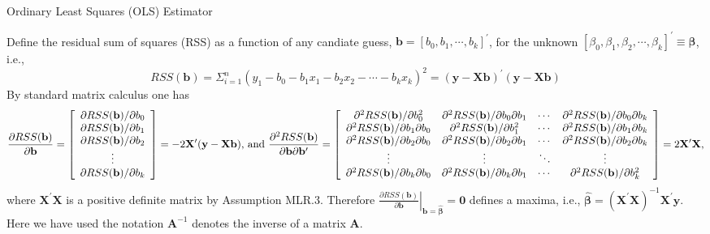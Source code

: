 \documentclass{article}%
\begin{document}
\bigskip

Ordinary Least Squares (OLS) Estimator

\bigskip

Define the residual sum of squares (RSS) as a function of any candiate guess,
$\mathbf{b}=[b_{0},b_{1},\cdots,b_{k}]^{\prime}$, for the unknown $[\beta
_{0},\beta_{1},\beta_{2},\cdots,\beta_{k}]^{\prime}\equiv\mathbf{\beta}$,
i.e.,%
\[
RSS(\mathbf{b})=\Sigma_{i=1}^{n}(y_{1}-b_{0}-b_{1}x_{1}-b_{2}x_{2}%
-\cdots-b_{k}x_{k})^{2}=(\mathbf{y}-\mathbf{Xb})^{\prime}(\mathbf{y}%
-\mathbf{Xb})
\]
By standard matrix calculus one has%
\[
\frac{\partial RSS(\mathbf{b})}{\partial\mathbf{b}}=\left[
\begin{array}
[c]{c}%
\partial RSS(\mathbf{b})/\partial b_{0}\\
\partial RSS(\mathbf{b})/\partial b_{1}\\
\partial RSS(\mathbf{b})/\partial b_{2}\\
\vdots\\
\partial RSS(\mathbf{b})/\partial b_{k}%
\end{array}
\right]  =-2\mathbf{X}^{\prime}(\mathbf{y}-\mathbf{Xb})\text{, and }%
\frac{\partial^{2}RSS(\mathbf{b})}{\partial\mathbf{b}\partial\mathbf{b}%
^{\prime}}=\left[
\begin{array}
[c]{cccc}%
\partial^{2}RSS(\mathbf{b})/\partial b_{0}^{2} & \partial^{2}RSS(\mathbf{b}%
)/\partial b_{0}\partial b_{1} & \cdots & \partial^{2}RSS(\mathbf{b})/\partial
b_{0}\partial b_{k}\\
\partial^{2}RSS(\mathbf{b})/\partial b_{1}\partial b_{0} & \partial
^{2}RSS(\mathbf{b})/\partial b_{1}^{2} & \cdots & \partial^{2}RSS(\mathbf{b}%
)/\partial b_{1}\partial b_{k}\\
\partial^{2}RSS(\mathbf{b})/\partial b_{2}\partial b_{0} & \partial
^{2}RSS(\mathbf{b})/\partial b_{2}\partial b_{1} & \cdots & \partial
^{2}RSS(\mathbf{b})/\partial b_{2}\partial b_{k}\\
\vdots & \vdots & \ddots & \vdots\\
\partial^{2}RSS(\mathbf{b})/\partial b_{k}\partial b_{0} & \partial
^{2}RSS(\mathbf{b})/\partial b_{k}\partial b_{1} & \cdots & \partial
^{2}RSS(\mathbf{b})/\partial b_{k}^{2}%
\end{array}
\right]  =2\mathbf{X}^{\prime}\mathbf{X}\text{,}%
\]
where $\mathbf{X}^{\prime}\mathbf{X}$ is a positive definite matrix by
Assumption MLR.3. Therefore $\left.  \frac{\partial RSS(\mathbf{b})}%
{\partial\mathbf{b}}\right\vert _{\mathbf{b}=\widehat{\mathbf{\beta}}%
}=\mathbf{0}$ defines a maxima, i.e., $\widehat{\mathbf{\beta}}=(\mathbf{X}%
^{\prime}\mathbf{X})^{-1}\mathbf{X}^{\prime}\mathbf{y}$. Here we have used the
notation $\mathbf{A}^{-1}$ denotes the inverse of a matrix $\mathbf{A}$.
\end{document}

